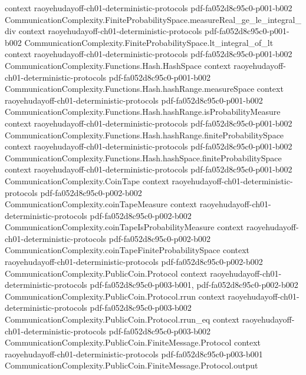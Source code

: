 \begin{theorem}
  {context}
  {raoyehudayoff-ch01-deterministic-protocols}
  {pdf-fa052d8c95c0-p001-b002}
\proofstep
  {CommunicationComplexity.FiniteProbabilitySpace.measureReal_ge_le_integral_div}
  {context}
  {raoyehudayoff-ch01-deterministic-protocols}
  {pdf-fa052d8c95c0-p001-b002}
\proofstep
  {CommunicationComplexity.FiniteProbabilitySpace.lt_integral_of_lt}
  {context}
  {raoyehudayoff-ch01-deterministic-protocols}
  {pdf-fa052d8c95c0-p001-b002}
\proofstep
  {CommunicationComplexity.Functions.Hash.HashSpace}
  {context}
  {raoyehudayoff-ch01-deterministic-protocols}
  {pdf-fa052d8c95c0-p001-b002}
\proofstep
  {CommunicationComplexity.Functions.Hash.hashRange.measureSpace}
  {context}
  {raoyehudayoff-ch01-deterministic-protocols}
  {pdf-fa052d8c95c0-p001-b002}
\proofstep
  {CommunicationComplexity.Functions.Hash.hashRange.isProbabilityMeasure}
  {context}
  {raoyehudayoff-ch01-deterministic-protocols}
  {pdf-fa052d8c95c0-p001-b002}
\proofstep
  {CommunicationComplexity.Functions.Hash.hashRange.finiteProbabilitySpace}
  {context}
  {raoyehudayoff-ch01-deterministic-protocols}
  {pdf-fa052d8c95c0-p001-b002}
\proofstep
  {CommunicationComplexity.Functions.Hash.hashSpace.finiteProbabilitySpace}
  {context}
  {raoyehudayoff-ch01-deterministic-protocols}
  {pdf-fa052d8c95c0-p001-b002}
\proofstep
  {CommunicationComplexity.CoinTape}
  {context}
  {raoyehudayoff-ch01-deterministic-protocols}
  {pdf-fa052d8c95c0-p002-b002}
\proofstep
  {CommunicationComplexity.coinTapeMeasure}
  {context}
  {raoyehudayoff-ch01-deterministic-protocols}
  {pdf-fa052d8c95c0-p002-b002}
\proofstep
  {CommunicationComplexity.coinTapeIsProbabilityMeasure}
  {context}
  {raoyehudayoff-ch01-deterministic-protocols}
  {pdf-fa052d8c95c0-p002-b002}
\proofstep
  {CommunicationComplexity.coinTapeFiniteProbabilitySpace}
  {context}
  {raoyehudayoff-ch01-deterministic-protocols}
  {pdf-fa052d8c95c0-p002-b002}
\proofstep
  {CommunicationComplexity.PublicCoin.Protocol}
  {context}
  {raoyehudayoff-ch01-deterministic-protocols}
  {pdf-fa052d8c95c0-p003-b001,
    pdf-fa052d8c95c0-p002-b002}
\proofstep
  {CommunicationComplexity.PublicCoin.Protocol.rrun}
  {context}
  {raoyehudayoff-ch01-deterministic-protocols}
  {pdf-fa052d8c95c0-p003-b002}
\proofstep
  {CommunicationComplexity.PublicCoin.Protocol.rrun_eq}
  {context}
  {raoyehudayoff-ch01-deterministic-protocols}
  {pdf-fa052d8c95c0-p003-b002}
\proofstep
  {CommunicationComplexity.PublicCoin.FiniteMessage.Protocol}
  {context}
  {raoyehudayoff-ch01-deterministic-protocols}
  {pdf-fa052d8c95c0-p003-b001}
\proofstep
  {CommunicationComplexity.PublicCoin.FiniteMessage.Protocol.output}

\end{theorem}
